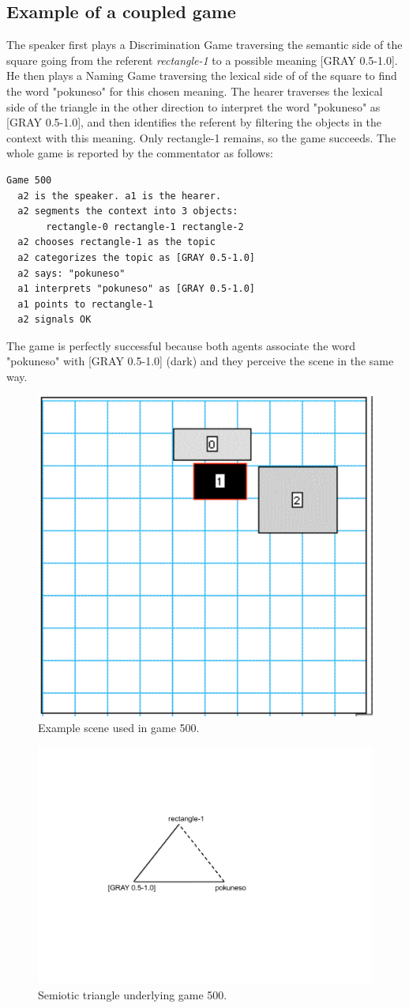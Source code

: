 \subsection{Example of a coupled game}

The speaker first plays a Discrimination Game traversing the 
semantic side of the square going from the referent 
{\it rectangle-1} to a possible meaning [GRAY 0.5-1.0]. 
He then plays a Naming Game traversing the lexical side of 
of the square to find the word "pokuneso" for this chosen meaning. 
The hearer traverses the lexical side of the triangle in 
the other direction to interpret the word "pokuneso" as
[GRAY 0.5-1.0], and then identifies the referent by 
filtering the objects in the context with this meaning. 
Only rectangle-1 remains, so the game succeeds. 
The whole game is reported by the commentator as follows: 
\begin{verbatim}
Game 500
  a2 is the speaker. a1 is the hearer. 
  a2 segments the context into 3 objects: 
       rectangle-0 rectangle-1 rectangle-2
  a2 chooses rectangle-1 as the topic 
  a2 categorizes the topic as [GRAY 0.5-1.0]
  a2 says: "pokuneso"
  a1 interprets "pokuneso" as [GRAY 0.5-1.0]
  a1 points to rectangle-1
  a2 signals OK 
\end{verbatim}
The game is perfectly successful because both 
agents associate the word "pokuneso" with 
[GRAY 0.5-1.0] (dark) and they perceive the scene 
in the same way.
\begin{figure}[htbp]
  \centerline{\includegraphics[width=.40\textwidth]{chap6/figs/recscene}}
\caption{\label{rect1} Example scene used
in game 500.}
\end{figure}

\begin{figure}[htbp]
  \centerline{\includegraphics[width=.45\textwidth]{chap6/figs/triangle2}}
\caption{\label{triangle2} Semiotic triangle 
underlying game 500.}
\end{figure}

